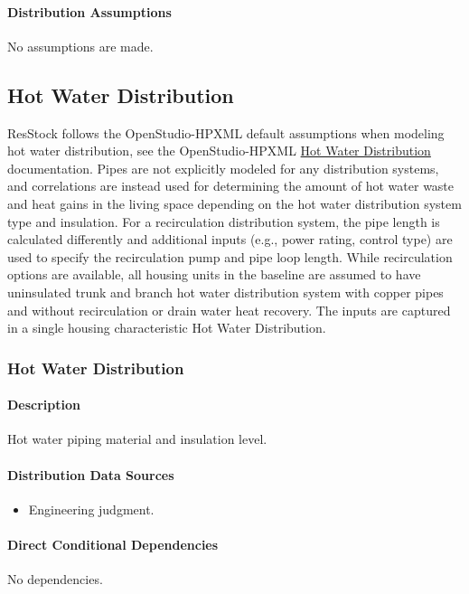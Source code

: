 \paragraph{Distribution Assumptions}
No assumptions are made.

\subsection{Hot Water Distribution}
ResStock follows the OpenStudio-HPXML default assumptions when modeling hot water distribution, see the OpenStudio-HPXML \href{https://openstudio-hpxml.readthedocs.io/en/v1.8.1/workflow_inputs.html#hpxml-hot-water-distribution}{Hot Water Distribution} documentation. Pipes are not explicitly modeled for any distribution systems, and correlations are instead used for determining the amount of hot water waste and heat gains in the living space depending on  the hot water distribution system type and insulation. For a recirculation distribution system, the pipe length is calculated differently and additional inputs (e.g., power rating, control type) are used to specify the recirculation pump and pipe loop length. While recirculation options are available, all housing units in the baseline are assumed to have uninsulated trunk and branch hot water distribution system with copper pipes and without recirculation or drain water heat recovery. The inputs are captured in a single housing characteristic Hot Water Distribution.

\subsubsection{Hot Water Distribution}\label{hot_water_distribution}
\paragraph{Description}
Hot water piping material and insulation level.

\paragraph{Distribution Data Sources}
\begin{itemize}
\item
  Engineering judgment.
\end{itemize}

\paragraph{Direct Conditional Dependencies}
No dependencies.

